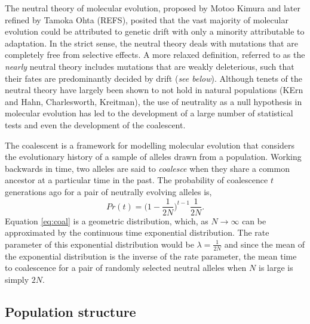 	The neutral theory of molecular evolution, proposed by Motoo Kimura and later refined by Tamoka Ohta (REFS), posited that the vast majority of molecular evolution could be attributed to genetic drift with only a minority attributable to adaptation. In the strict sense, the neutral theory deals with mutations that are completely free from selective effects. A more relaxed definition, referred to as the \textit{nearly} neutral theory includes mutations that are weakly deleterious, such that their fates are predominantly decided by drift (\textit{see below}). Although tenets of the neutral theory have largely been shown to not hold in natural populations (KErn and Hahn, Charlesworth, Kreitman), the use of neutrality as a null hypothesis in molecular evolution has led to the development of a large number of statistical tests and even the development of the coalescent.

	The coalescent is a framework for modelling molecular evolution that considers the evolutionary history of a sample of alleles drawn from a population. Working backwards in time, two alleles are said to \textit{coalesce} when they share a common ancestor at a particular time in the past. The probability of coalescence $t$ generations ago for a pair of neutrally evolving alleles is,
	\begin{equation}
	Pr(t) = \Big(1 - \frac{1}{2N}\Big)^{t-1}\frac{1}{2N}.
	\label{eq:coal}
	\end{equation}
\noindent
Equation \ref{eq:coal} is a geometric distribution, which, as $N \to \infty$ can be approximated by the continuous time exponential distribution. The rate parameter of this exponential distribution would be $\lambda = \frac{1}{2N}$ and since the mean of the exponential distribution is the inverse of the rate parameter, the mean time to coalescence for a pair of randomly selected neutral alleles  when $N$ is large is simply $2N$.
		
\subsection{Population structure}

